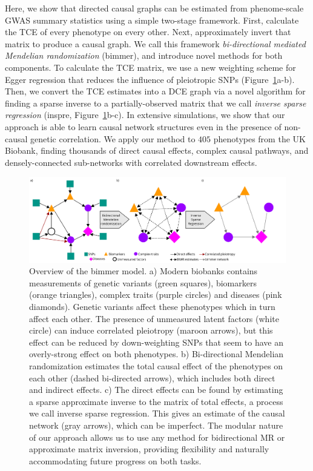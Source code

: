 \documentclass{article}
\begin{document}
Here, we show that directed causal graphs can be estimated from phenome-scale GWAS summary
statistics using a simple two-stage framework. First, calculate the TCE of every phenotype
on every other. Next, approximately invert that matrix to produce a causal graph.
We call this framework \emph{bi-directional mediated Mendelian randomization} (bimmer),
and introduce novel methods for both components. To calculate the TCE matrix, we
use a new weighting scheme for Egger regression that reduces the
influence of pleiotropic SNPs (Figure~\ref{figure0}a-b). Then, we convert the TCE
estimates into a DCE graph via a novel algorithm for finding a sparse inverse
to a partially-observed matrix that we call
\emph{inverse sparse regression} (inspre, Figure~\ref{figure0}b-c).
In extensive simulations, we show that our approach is able to learn causal
 network structures even in the presence of non-causal genetic correlation.
We apply our method to $405$ phenotypes from the UK Biobank, finding thousands
 of direct causal effects, complex causal pathways, and densely-connected sub-networks
 with correlated downstream effects. 
 
\begin{figure}
\includegraphics[width=\textwidth]{figures/bimmer_fig1.pdf}
\caption{Overview of the bimmer model. a) Modern biobanks contains measurements
of genetic variants (green squares), biomarkers
(orange triangles), complex traits (purple circles) and diseases (pink diamonds). Genetic variants
affect these phenotypes which in turn affect each other. The presence of unmeasured latent factors
(white circle)
can induce correlated pleiotropy (maroon arrows), but this effect can be reduced by down-weighting
SNPs that seem to have an overly-strong effect on both phenotypes. b) Bi-directional Mendelian randomization
estimates the total causal effect of the phenotypes on each other (dashed bi-directed arrows),
which includes both direct and indirect effects. c) The direct effects can be
found by estimating a sparse approximate inverse to the matrix of total effects, a process we
call inverse sparse regression. This gives an estimate of the causal network (gray arrows), which
can be imperfect. The modular nature of our approach allows us to use any method for bidirectional
MR or approximate matrix inversion, providing flexibility
and naturally accommodating future progress on both tasks.}
\label{figure0}
\end{figure}
\end{document}
